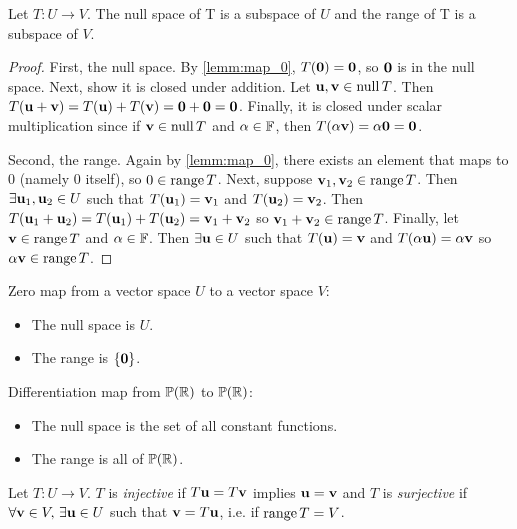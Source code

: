 \documentclass{article}
\begin{document}
\begin{proposition}
Let $T: U \to V$. The null space of T is a subspace of $U$ and the range of T is a subspace of $V$.
\end{proposition}
\begin{proof}
First, the null space. By \cref{lemm:map_0}, $T({\mathbf{0}}) = {\mathbf{0}}$, so ${\mathbf{0}}$ is in the null space. Next, show it is closed under addition. Let ${\mathbf{u}},{\mathbf{v}} \in \operatorname{null} T$. Then $T({\mathbf{u}} + {\mathbf{v}}) = T({\mathbf{u}}) + T({\mathbf{v}}) = {\mathbf{0}}+{\mathbf{0}} = {\mathbf{0}}$. Finally, it is closed under scalar multiplication since if ${\mathbf{v}} \in \operatorname{null} T$ and $\alpha \in {\mathbb{F}}$, then $T(\alpha {\mathbf{v}}) = \alpha {\mathbf{0}} = {\mathbf{0}}$.

Second, the range. Again by \cref{lemm:map_0}, there exists an element that maps to 0 (namely 0 itself), so $0 \in \operatorname{range} T$. Next, suppose ${\mathbf{v}}_1,{\mathbf{v}}_2 \in \operatorname{range} T$. Then $\exists {\mathbf{u}}_1, {\mathbf{u}}_2 \in U$ such that $T({\mathbf{u}}_1) = {\mathbf{v}}_1$ and $T({\mathbf{u}}_2) = {\mathbf{v}}_2$. Then $T({\mathbf{u}}_1 + {\mathbf{u}}_2) = T({\mathbf{u}}_1) + T({\mathbf{u}}_2) = {\mathbf{v}}_1 + {\mathbf{v}}_2$ so ${\mathbf{v}}_1 + {\mathbf{v}}_2 \in \operatorname{range} T$. Finally, let ${\mathbf{v}} \in \operatorname{range} T$ and $\alpha \in {\mathbb{F}}$. Then $\exists {\mathbf{u}} \in U$ such that $T({\mathbf{u}}) = {\mathbf{v}}$ and $T(\alpha {\mathbf{u}}) = \alpha {\mathbf{v}}$ so $\alpha {\mathbf{v}} \in \operatorname{range} T$. 
\end{proof}

\begin{example}
Zero map from a vector space $U$ to a vector space $V$:
\begin{itemize}
    \item The null space is $U$.
    \item The range is $\{{\mathbf{0}}\}$.
\end{itemize}
Differentiation map from $\mathbb{P}({\mathbb{R}})$ to $\mathbb{P}({\mathbb{R}})$:
\begin{itemize}
    \item The null space is the set of all constant functions.
    \item The range is all of $\mathbb{P}({\mathbb{R}})$.
\end{itemize}
\end{example}

\begin{definition}
Let $T:U \to V$. $T$ is \emph{injective} if $T{\mathbf{u}} = T{\mathbf{v}}$ implies ${\mathbf{u}} = {\mathbf{v}}$ and $T$ is \emph{surjective} if $\forall {\mathbf{v}} \in V, \, \exists  {\mathbf{u}} \in U$ such that ${\mathbf{v}} = T{\mathbf{u}}$, i.e. if $\operatorname{range} T = V$.
\end{definition}
\end{document}
